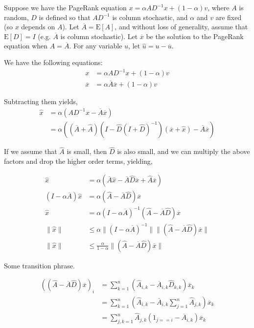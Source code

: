 \documentclass{article}
\newcommand \E[1] {\mathrm E \left[#1\right]} %
\newcommand \inv [1] {{#1}^{-1}} %
\begin{document}
Suppose we have the PageRank equation $x=\alpha A \inv D x + (1-\alpha)v$, where $A$ is random, $D$ is defined so that $A\inv D$ is column stochastic, and $\alpha$ and $v$ are fixed (so $x$ depends on $A$). Let $\overline A=\E A$, and without loss of generality, assume that $\E D=I$ (e.g. $\overline A$ is column stochastic). Let $\overline x$ be the solution to the PageRank equation when $A=\overline A$. For any variable $u$, let $\hat u = u - \overline u$.

We have the following equations:
\begin{align*}
x &= \alpha A \inv D x + (1-\alpha)v \\
\overline x &= \alpha \overline A \overline x + (1-\alpha)v
\end{align*}

Subtracting them yields,
\begin{align*}
\hat x &= \alpha(A\inv D x - \overline A\overline x) \\
&= \alpha((\overline A+\hat A)(I-\hat D\inv{(I+\hat D)})(\overline x+\hat x) - \overline A\overline x)
\end{align*}

If we assume that $\hat A$ is small, then $\hat D$ is also small, and we can multiply the above factors and drop the higher order terms, yielding,

\begin{align*}
\hat x &= \alpha(\overline A\hat x - \overline A\hat D\overline x + \hat A\overline x) \\
(I-\alpha\overline A)\hat x &= \alpha(\hat A - \overline A\hat D)\overline x \\
\hat x &= \alpha (I-\alpha\overline A)^{-1} (\hat A - \overline A\hat D)\overline x \\
\|\hat x\| &\leq \alpha \|(I-\alpha\overline A)^{-1}\| \|(\hat A - \overline A\hat D)\overline x\| \\
\|\hat x\| &\leq \frac\alpha{1-\alpha} \|(\hat A - \overline A\hat D)\overline x\|
\end{align*}

Some transition phrase.

\begin{align*}
((\hat A-\overline A\hat D)\overline x)_i &= \sum_{k=1}^n (\hat A_{i,k} - \overline A_{i,k} \hat D_{k,k}) \overline x_k \\
&= \sum_{k=1}^n (\hat A_{i,k} - \overline A_{i,k} \sum_{j=1}^n \hat A_{j,k}) \overline x_k \\
&= \sum_{j,k=1}^n \hat A_{j,k}(1_{j==i}-\overline A_{i,k})\overline x_k
\end{align*}
\end{document}
